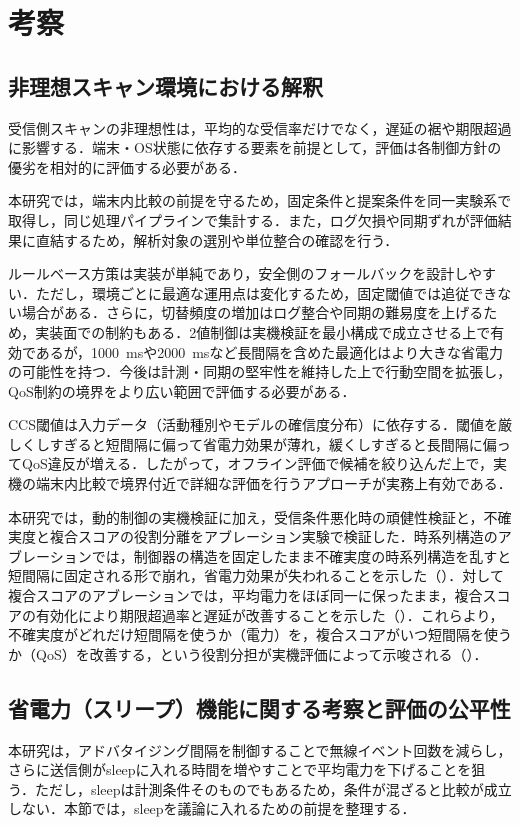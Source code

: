 \chapter{考察}
\label{ch:discussion}
\clearpage

\section{非理想スキャン環境における解釈}
受信側スキャンの非理想性は，平均的な受信率だけでなく，遅延の裾や期限超過に影響する．端末・OS状態に依存する要素を前提として，評価は各制御方針の優劣を相対的に評価する必要がある．

本研究では，端末内比較の前提を守るため，固定条件と提案条件を同一実験系で取得し，同じ処理パイプラインで集計する．また，ログ欠損や同期ずれが評価結果に直結するため，解析対象の選別や単位整合の確認を行う．

ルールベース方策は実装が単純であり，安全側のフォールバックを設計しやすい．ただし，環境ごとに最適な運用点は変化するため，固定閾値では追従できない場合がある．さらに，切替頻度の増加はログ整合や同期の難易度を上げるため，実装面での制約もある．2値制御は実機検証を最小構成で成立させる上で有効であるが，\SI{1000}{\milli\second}や\SI{2000}{\milli\second}など長間隔を含めた最適化はより大きな省電力の可能性を持つ．今後は計測・同期の堅牢性を維持した上で行動空間を拡張し，QoS制約の境界をより広い範囲で評価する必要がある．

CCS閾値は入力データ（活動種別やモデルの確信度分布）に依存する．閾値を厳しくしすぎると短間隔に偏って省電力効果が薄れ，緩くしすぎると長間隔に偏ってQoS違反が増える．したがって，オフライン評価で候補を絞り込んだ上で，実機の端末内比較で境界付近で詳細な評価を行うアプローチが実務上有効である．

本研究では，動的制御の実機検証に加え，受信条件悪化時の頑健性検証と，不確実度と複合スコアの役割分離をアブレーション実験で検証した．時系列構造のアブレーションでは，制御器の構造を固定したまま不確実度の時系列構造を乱すと短間隔に固定される形で崩れ，省電力効果が失われることを示した（）．対して複合スコアのアブレーションでは，平均電力をほぼ同一に保ったまま，複合スコアの有効化により期限超過率と遅延が改善することを示した（）．これらより，不確実度がどれだけ短間隔を使うか（電力）を，複合スコアがいつ短間隔を使うか（QoS）を改善する，という役割分担が実機評価によって示唆される（）．

\section{省電力（スリープ）機能に関する考察と評価の公平性}
本研究は，アドバタイジング間隔を制御することで無線イベント回数を減らし，さらに送信側がsleepに入れる時間を増やすことで平均電力を下げることを狙う．ただし，sleepは計測条件そのものでもあるため，条件が混ざると比較が成立しない．本節では，sleepを議論に入れるための前提を整理する．

